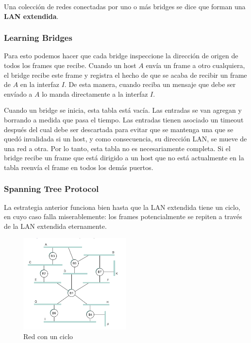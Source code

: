Una colección de redes conectadas por uno o más bridges se dice que forman una \textbf{LAN extendida}.

\subsubsection{Learning Bridges}
Para esto podemos hacer que cada bridge inspeccione la dirección de origen de todos los frames que recibe. Cuando un host \(A\) envía un frame a otro cualquiera, el bridge recibe este frame y registra el hecho de que se acaba de recibir un frame de \(A\) en la interfaz \(I\). De esta manera, cuando reciba un mensaje que debe ser envíado a \(A\) lo manda directamente a la interfaz \(I\).

Cuando un bridge se inicia, esta tabla está vacía. Las entradas se van agregan y borrando a medida que pasa el tiempo. Las entradas tienen asociado un timeout después del cual debe ser descartada para evitar que se mantenga una que se quedó invalidada si un host, y como consecuencia, su dirección LAN, se mueve de una red a otra. Por lo tanto, esta tabla no es necesariamente completa. Si el bridge recibe un frame que está dirigido a un host que no está actualmente en la tabla reenvía el frame en todos los demás puertos.

\subsubsection{Spanning Tree Protocol}
La estrategia anterior funciona bien hasta que la LAN extendida tiene un ciclo, en cuyo caso falla miserablemente: los frames potencialmente se repiten a través de la LAN extendida eternamente.
\begin{figure}[H]
	\centering
	\includegraphics[width=0.5\textwidth
]{images/looped-network.png}
	\caption[Red con un ciclo]{Red con un ciclo}
	\label{fig:looped-network}
\end{figure}

